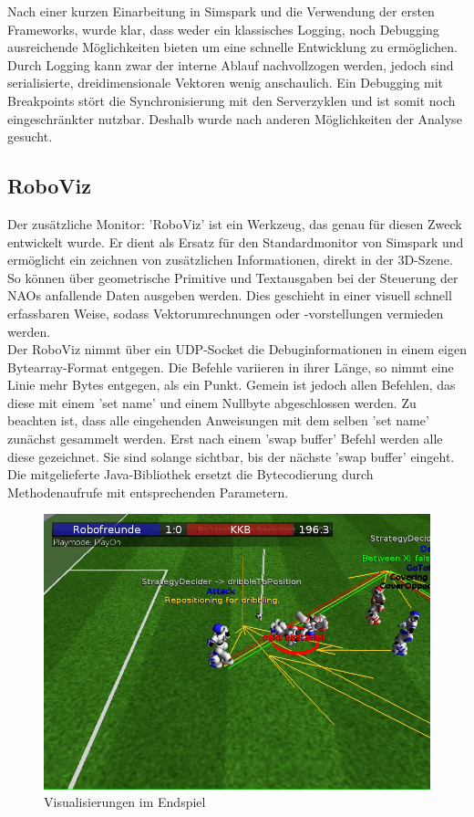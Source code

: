Nach einer kurzen Einarbeitung in Simspark und die Verwendung der ersten Frameworks, wurde klar, dass weder ein klassisches Logging, noch Debugging ausreichende Möglichkeiten bieten um eine schnelle Entwicklung zu ermöglichen. Durch Logging kann zwar der interne Ablauf nachvollzogen werden, jedoch sind serialisierte, dreidimensionale Vektoren wenig anschaulich.
Ein Debugging mit Breakpoints stört die Synchronisierung mit den Serverzyklen und ist somit noch eingeschränkter nutzbar. Deshalb wurde nach anderen Möglichkeiten der Analyse gesucht.

\subsection{RoboViz}
\label{subsec:RoboViz}
Der zusätzliche Monitor: 'RoboViz' ist ein Werkzeug, das genau für diesen Zweck entwickelt wurde. Er dient als Ersatz für den Standardmonitor von Simspark und ermöglicht ein zeichnen von zusätzlichen Informationen, direkt in der 3D-Szene. So können über geometrische Primitive und Textausgaben bei der Steuerung der NAOs anfallende Daten ausgeben werden. Dies geschieht in einer visuell schnell erfassbaren Weise, sodass Vektorumrechnungen oder -vorstellungen vermieden werden.\\

Der RoboViz nimmt über ein UDP-Socket die Debuginformationen in einem eigen Bytearray-Format entgegen. Die Befehle variieren in ihrer Länge, so nimmt eine Linie mehr Bytes entgegen, als ein Punkt. Gemein ist jedoch allen Befehlen, das diese mit einem 'set name' und einem Nullbyte abgeschlossen werden. Zu beachten ist, dass alle eingehenden Anweisungen mit dem selben 'set name' zunächst gesammelt werden. Erst nach einem 'swap buffer' Befehl werden alle diese gezeichnet. Sie sind solange sichtbar, bis der nächste 'swap buffer' eingeht.\\
Die mitgelieferte Java-Bibliothek ersetzt die Bytecodierung durch Methodenaufrufe mit entsprechenden Parametern.

\begin{figure}[H]
	\centering
	\includegraphics[width=\ScaleIfNeeded]{Grafiken/RoboViz/RoboVizzingToDaMax}
	\caption{Visualisierungen im Endspiel}
	\label{fig:roboviz-endgame}
\end{figure}


